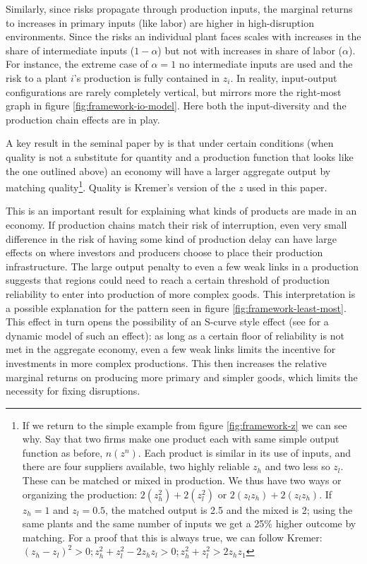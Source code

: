 \documentclass[11pt]{article}
\begin{document}
Similarly, since risks propagate through production inputs, the marginal returns to increases in primary inputs (like labor) are higher in high-disruption environments. Since the risks an individual plant faces scales with increases in the share of intermediate inputs (\(1 - \alpha\)) but not with increases in share of labor (\(\alpha\)). For instance, the extreme case of \(\alpha = 1\) no intermediate inputs are used and the risk to a plant \(i\)'s production is fully contained in \(z_i\). In reality, input-output configurations are rarely completely vertical, but mirrors more the right-most graph in figure \ref{fig:framework-io-model}. Here both the input-diversity and the production chain effects are in play.

A key result in the seminal paper by \cite{kremer_o-ring_1993} is that under certain conditions (when quality is not a substitute for quantity and a production function that looks like the one outlined above) an economy will have a larger aggregate output by matching quality\footnote{If we return to the simple example from figure \ref{fig:framework-z} we can see why. Say that two firms make one product each with same simple output function as before, \(n(z^n)\). Each product is similar in its use of inputs, and there are four suppliers available, two
  highly reliable \(z_{h}\) and two less so \(z_{l}\). These can be matched or mixed in production. We thus have two ways or organizing the production: \(2(z_h^2) + 2(z_l^2)\) or \(2(z_l z_h) + 2(z_l z_h)\). If \(z_h = 1\) and \(z_l = 0.5\), the matched output is 2.5 and the mixed is 2; using the same plants and the same number of inputs we get a 25\% higher outcome by matching. For a proof that this is always true, we can follow Kremer: \((z_h - z_l)^2 > 0; z_h^2 + z_l^2 - 2z_h z_l > 0; z_h^2 + z_l^2 > 2z_h z_1 \)}. Quality is Kremer's version of the \(z\) used in this paper. 

  This is an important result for explaining what kinds of products are made in an economy. If production chains match their risk of interruption, even very small difference in the risk of having some kind of production delay can have large effects on where investors and producers choose to place their production infrastructure. The large output penalty to even a few weak links in a production suggests that regions could need to reach a certain threshold of production reliability to enter into production of more complex goods. This interpretation is a possible explanation for the pattern seen in figure \ref{fig:framework-least-most}. This effect in turn opens the possibility of an S-curve style effect (see \cite{brummitt_contagious_2017} for a dynamic model of such an effect): as long as a certain floor of reliability is not met in the aggregate economy, even a few weak links limits the incentive for investments in more complex productions. This then increases the relative marginal returns on producing more primary and simpler goods, which limits the necessity for fixing disruptions.
\end{document}
